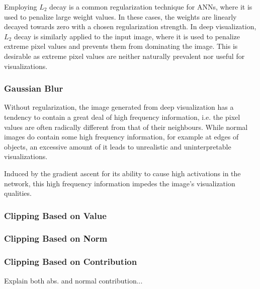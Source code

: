 Employing $L_2$ decay is a common regularization technique for ANNs, where it is used to penalize large weight values. In these cases, the weights are linearly decayed towards zero with a chosen regularization strength. In deep visualization, $L_2$ decay is similarly applied to the input image, where it is used to penalize extreme pixel values and prevents them from dominating the image. This is desirable as extreme pixel values are neither naturally prevalent nor useful for visualizations.

\subsubsection{Gaussian Blur}

Without regularization, the image generated from deep visualization has a tendency to contain a great deal of high frequency information, i.e. the pixel values are often radically different from that of their neighbours. While normal images do contain some high frequency information, for example at edges of objects, an excessive amount of it leads to unrealistic and uninterpretable visualizations. 

Induced by the gradient ascent for its ability to cause high activations in the network, this high frequency information impedes the image's visualization qualities. 

\subsubsection{Clipping Based on Value}



\subsubsection{Clipping Based on Norm}



\subsubsection{Clipping Based on Contribution}
Explain both abs. and normal contribution...


